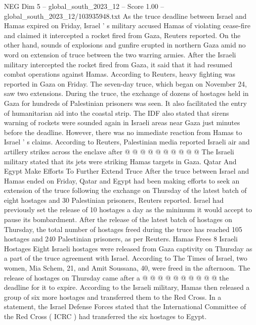 \begin{textsample}{NEG Dim 5 – global\_south\_2023\_12 – Score 1.00 – global\_south\_2023\_12/103935948.txt}  \label{ex:f5_neg_352}
As the truce deadline between Israel and Hamas expired on Friday, Israel ' s military accused Hamas of violating cease-fire and claimed it intercepted a rocket fired from Gaza, Reuters reported.
On the other hand, sounds of explosions and gunfire erupted in northern Gaza amid no word on extension of truce between the two warring armies.
After the Israeli military intercepted the rocket fired from Gaza, it said that it had resumed combat operations against Hamas.
According to Reuters, heavy fighting was reported in Gaza on Friday.
The seven-day truce, which began on November 24, saw two extensions.
During the truce, the exchange of dozens of hostages held in Gaza for hundreds of Palestinian prisoners was seen.
It also facilitated the entry of humanitarian aid into the coastal strip.
The IDF also stated that sirens warning of rockets were sounded again in Israeli areas near Gaza just minutes before the deadline.
However, there was no immediate reaction from Hamas to Israel ' s claims.
According to Reuters, Palestinian media reported Israeli air and artillery strikes across the enclave after @ @ @ @ @ @ @ @ @ @ The Israeli military stated that its jets were striking Hamas targets in Gaza.
Qatar And Egypt Make Efforts To Further Extend Truce After the truce between Israel and Hamas ended on Friday, Qatar and Egypt had been making efforts to seek an extension of the truce following the exchange on Thursday of the latest batch of eight hostages and 30 Palestinian prisoners, Reuters reported.
Israel had previously set the release of 10 hostages a day as the minimum it would accept to pause its bombardment.
After the release of the latest batch of hostages on Thursday, the total number of hostages freed during the truce has reached 105 hostages and 240 Palestinian prisoners, as per Reuters.
Hamas Frees 8 Israeli Hostages Eight Israeli hostages were released from Gaza captivity on Thursday as a part of the truce agreement with Israel.
According to The Times of Israel, two women, Mia Schem, 21, and Amit Soussana, 40, were freed in the afternoon.
The release of hostages on Thursday came after a @ @ @ @ @ @ @ @ @ @ the deadline for it to expire.
According to the Israeli military, Hamas then released a group of six more hostages and transferred them to the Red Cross.
In a statement, the Israel Defense Forces stated that the International Committee of the Red Cross ( ICRC ) had transferred the six hostages to Egypt.

\end{textsample}

